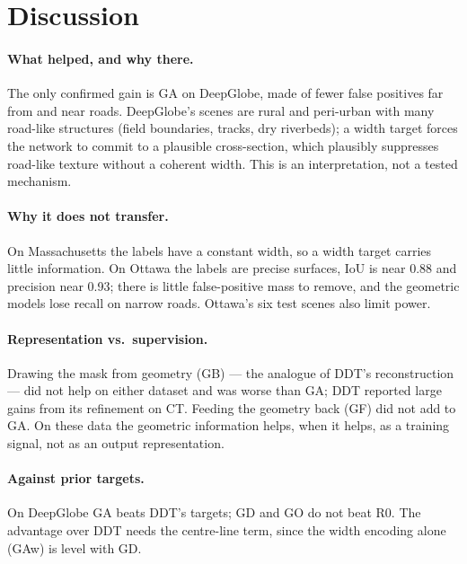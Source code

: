\documentclass[11pt]{article}
\begin{document}
\section{Discussion}

\paragraph{What helped, and why there.} The only confirmed gain is GA on DeepGlobe, made of fewer
false positives far from and near roads. DeepGlobe's scenes are rural and peri-urban with many
road-like structures (field boundaries, tracks, dry riverbeds); a width target forces the network to
commit to a plausible cross-section, which plausibly suppresses road-like texture without a coherent
width. This is an interpretation, not a tested mechanism.

\paragraph{Why it does not transfer.} On Massachusetts the labels have a constant width, so a width
target carries little information. On Ottawa the labels are precise surfaces, IoU is near 0.88 and
precision near 0.93; there is little false-positive mass to remove, and the geometric models lose
recall on narrow roads. Ottawa's six test scenes also limit power.

\paragraph{Representation vs.\ supervision.} Drawing the mask from geometry (GB) --- the analogue of
DDT's reconstruction --- did not help on either dataset and was worse than GA; DDT reported large gains
from its refinement on CT. Feeding the geometry back (GF) did not add to GA. On these data the
geometric information helps, when it helps, as a training signal, not as an output representation.

\paragraph{Against prior targets.} On DeepGlobe GA beats DDT's targets; GD and GO do not beat R0. The
advantage over DDT needs the centre-line term, since the width encoding alone (GAw) is level with GD.

\end{document}
